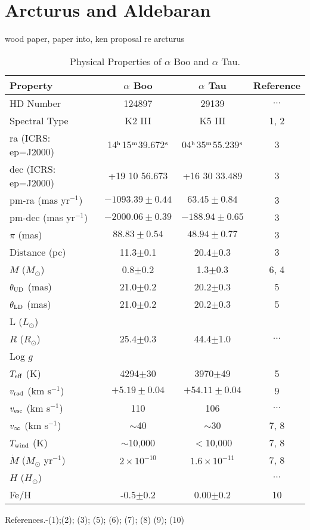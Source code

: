 \section{Arcturus and Aldebaran}\label{sec:3.4}
wood paper, paper into, ken proposal re arcturus
\begin{table}
\begin{center}
\caption[Physical Properties of $\alpha$ Boo and $\alpha$ Tau.]
{Physical Properties of $\alpha$ Boo and $\alpha$ Tau.}
\begin{tabular}{lccc}
\hline
\hline
\rule{0pt}{2.5ex}Property & $\alpha$ Boo & $\alpha$ Tau & Reference\\
\hline
\rule{0pt}{2.5ex}HD Number & 124897 & 29139 & $\ldots$\\
Spectral Type & K2 III & K5 III& 1, 2\\ 
ra (ICRS: ep=J2000)&14$^{\rm{h}}$15$^{\rm{m}}$39.672$^{\rm{s}}$&04$^{\rm{h}}$35$^{\rm{m}}$55.239$^{\rm{s}}$&3\\
dec (ICRS: ep=J2000) & +19 10 56.673 & +16 30 33.489 & 3 \\
pm-ra (mas yr$^{-1}$)& $-1093.39 \pm 0.44$ & $63.45\pm 0.84$  & 3 \\
pm-dec (mas yr$^{-1}$)& $-2000.06 \pm 0.39$ & $-188.94\pm 0.65$ & 3 \\
$\pi$ (mas)& $88.83\pm 0.54$ & $48.94\pm 0.77$& 3\\
Distance (pc)& 11.3$\pm$0.1 & 20.4$\pm$0.3& 3\\
$M$ ($M_{\odot}$) & 0.8$\pm$0.2 & 1.3$\pm$0.3& 6, 4 \\
$\theta _{\rm{UD}}$ (mas)& 21.0$\pm$0.2 & 20.2$\pm$0.3& 5 \\
$\theta _{\rm{LD}}$ (mas)& 21.0$\pm$0.2 & 20.2$\pm$0.3& 5 \\
L ($L_{\odot}$)& & & \\
$R$ ($R_{\odot}$)& 25.4$\pm$0.3 & 44.4$\pm$1.0 & $\ldots$ \\
Log $g$ & & & \\
$T_{\rm{eff}}$ (K) & 4294$\pm$30 & 3970$\pm$49& 5 \\
$v_{\rm{rad}}$ (km s$^{-1}$) & $+5.19 \pm 0.04$ & $+54.11\pm 0.04$ & 9\\
$v_{\rm{esc}}$ (km s$^{-1}$) &110 & 106& $\ldots$\\
$v_{\rm{\infty}}$ (km s$^{-1}$)& $\sim$40 & $\sim$30& 7, 8\\
$T_{\rm{wind}}$ (K)& $\sim$10,000 & $<$10,000 & 7, 8\\
$\dot{M}$ ($M_{\odot}$ yr$^{-1}$)& $2\times 10^{-10}$& $1.6\times 10^{-11}$& 7, 8\\
$H$ ($H_{\odot}$)& & & $\ldots$\\
Fe/H& -0.5$\pm$0.2 & 0.00$\pm$0.2 & 10\\
\hline
\end{tabular}
\label{tab:1}
\begin{minipage}{13.0cm}
References.-(1);(2)\cite{gray_2006}; (3)\cite{van_leeuwen_2007}; (5)\cite{di_benedetto_1993};
(6)\cite{kallinger_2010}; (7)\cite{drake_1985}; (8)\cite{robinson_1998}
(9)\cite{massarotti_2008}; (10)\cite{decin_2003}
\end{minipage}
\end{center}
\end{table}


